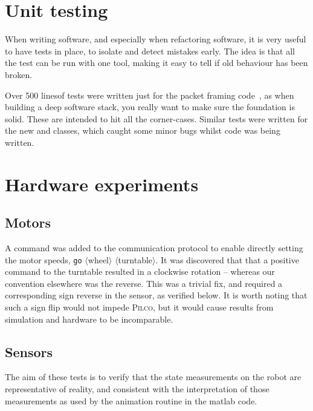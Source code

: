 \documentclass[main.tex]{subfiles}
\begin{document}
\section{Unit testing}
	When writing software, and especially when refactoring software, it is very useful to have tests in place, to isolate and detect mistakes early.
	The idea is that all the test can be run with one tool, making it easy to tell if old behaviour has been broken.

	Over 500 lines\footnotemark of tests were written just for the packet framing code~\cite{packetio}, as when building a deep software stack, you really want to make sure the foundation is solid. These are intended to hit all the corner-cases.
	Similar tests were written for the new  and  classes, which caught some minor bugs whilst code was being written.


\section{Hardware experiments}

	\subsection{Motors}
		A command was added to the communication protocol to enable directly setting the motor speeds, \texttt{go} $\langle$wheel$\rangle$ $\langle$turntable$\rangle$.
		It was discovered that that a positive command to the turntable resulted in a clockwise rotation -- whereas our convention elsewhere was the reverse.
		This was a trivial fix, and required a corresponding sign reverse in the sensor, as verified below.
		It is worth noting that such a sign flip would not impede \textsc{Pilco}, but it would cause results from simulation and hardware to be incomparable.

	\subsection{Sensors}
		The aim of these tests is to verify that the state measurements on the robot are representative of reality, and consistent with the interpretation of those measurements as used by the animation routine in the matlab code\footnotemark.
\end{document}
